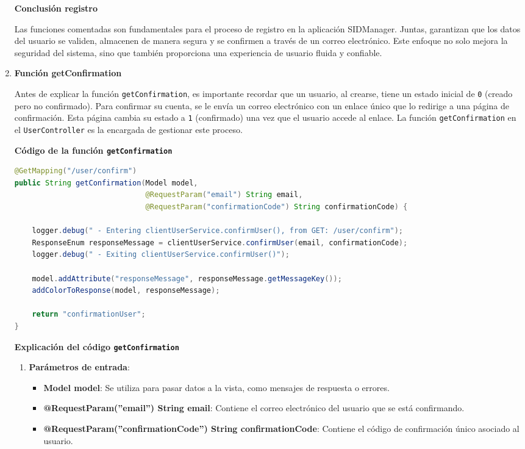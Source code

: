 \documentclass[draft]{scrbook}
\begin{document}
\begin{enumerate}
\textbf{Conclusión registro}

Las funciones comentadas son fundamentales para el proceso de registro en la aplicación SIDManager. Juntas, garantizan que los datos del usuario se validen, almacenen de manera segura y se confirmen a través de un correo electrónico. Este enfoque no solo mejora la seguridad del sistema, sino que también proporciona una experiencia de usuario fluida y confiable.
    
    \item \textbf{Función getConfirmation}

Antes de explicar la función \texttt{getConfirmation}, es importante recordar que un usuario, al crearse, tiene un estado inicial de \texttt{0} (creado pero no confirmado). Para confirmar su cuenta, se le envía un correo electrónico con un enlace único que lo redirige a una página de confirmación. Esta página cambia su estado a \texttt{1} (confirmado) una vez que el usuario accede al enlace. La función \texttt{getConfirmation} en el \texttt{UserController} es la encargada de gestionar este proceso.

\textbf{Código de la función \texttt{getConfirmation}}

\begin{lstlisting}[language=Java]
@GetMapping("/user/confirm")
public String getConfirmation(Model model, 
                              @RequestParam("email") String email,
                              @RequestParam("confirmationCode") String confirmationCode) {
    
    logger.debug(" - Entering clientUserService.confirmUser(), from GET: /user/confirm");
    ResponseEnum responseMessage = clientUserService.confirmUser(email, confirmationCode);
    logger.debug(" - Exiting clientUserService.confirmUser()");
    
    model.addAttribute("responseMessage", responseMessage.getMessageKey());
    addColorToResponse(model, responseMessage);
    
    return "confirmationUser"; 
}    
\end{lstlisting}

\textbf{Explicación del código \texttt{getConfirmation}}

\begin{enumerate}
    \item \textbf{Parámetros de entrada}:
    \begin{itemize}
        \item \textbf{Model model}: Se utiliza para pasar datos a la vista, como mensajes de respuesta o errores.
        \item \textbf{@RequestParam(''email'') String email}: Contiene el correo electrónico del usuario que se está confirmando.
        \item \textbf{@RequestParam(''confirmationCode'') String confirmationCode}: Contiene el código de confirmación único asociado al usuario.
    \end{itemize}


\end{enumerate}
\end{enumerate}
\end{document}

